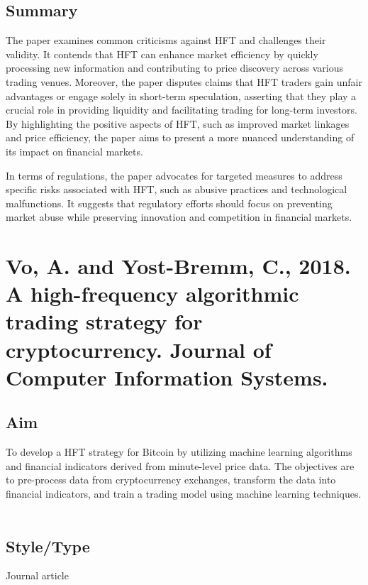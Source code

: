 \documentclass{article}
\begin{document}
    \subsection*{Summary}
    The paper examines common criticisms against HFT and challenges their validity. It contends that HFT can enhance market efficiency by quickly processing new information and contributing to price discovery across various trading venues. Moreover, the paper disputes claims that HFT traders gain unfair advantages or engage solely in short-term speculation, asserting that they play a crucial role in providing liquidity and facilitating trading for long-term investors. By highlighting the positive aspects of HFT, such as improved market linkages and price efficiency, the paper aims to present a more nuanced understanding of its impact on financial markets.

    In terms of regulations, the paper advocates for targeted measures to address specific risks associated with HFT, such as abusive practices and technological malfunctions. It suggests that regulatory efforts should focus on preventing market abuse while preserving innovation and competition in financial markets. 


    
\section{Vo, A. and Yost-Bremm, C., 2018. A high-frequency algorithmic trading strategy for cryptocurrency. Journal of Computer Information Systems.}
    \justify
    \setlength{\parindent}{1em} %
    \subsection*{Aim}
    To develop a HFT strategy for Bitcoin by utilizing machine learning algorithms and financial indicators derived from minute-level price data.
    The objectives are to pre-process data from cryptocurrency exchanges, transform the data into financial indicators, and train a trading model using machine learning techniques.\\\\
    
    \subsection*{Style/Type}
    Journal article\\\\
    
\end{document}
